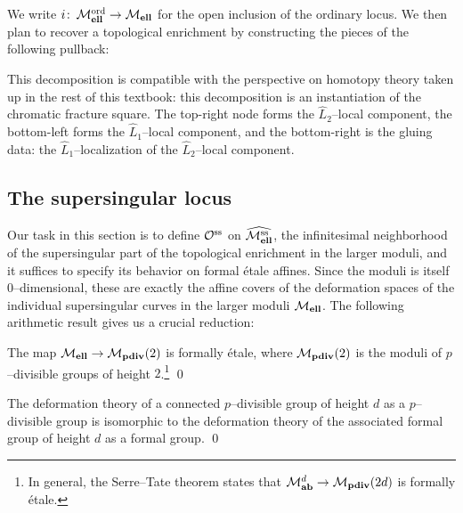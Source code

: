 \noindent We write $i\colon\thinspace \mathcal{M}_{\mathbf{ell}}^{\mathrm{ord}} \to \mathcal{M}_{\mathbf{ell}}$ for the open inclusion of the ordinary locus.  We then plan to recover a topological enrichment by constructing the pieces of the following pullback:
\begin{center}
\end{center}
This decomposition is compatible with the perspective on homotopy theory taken up in the rest of this textbook: this decomposition is an instantiation of the chromatic fracture square.  The top-right node forms the $\widehat L_2$--local component, the bottom-left forms the $\widehat L_1$--local component, and the bottom-right is the gluing data: the $\widehat L_1$--localization of the $\widehat L_2$--local component.






\subsection*{The supersingular locus}

Our task in this section is to define $\mathcal{O}^{\mathrm{ss}}$ on $\widehat{\mathcal{M}_{\mathbf{ell}}^{\mathrm{ss}}}$, the infinitesimal neighborhood of the supersingular part of the topological enrichment in the larger moduli, and it suffices to specify its behavior on formal \'etale affines.  Since the moduli is itself $0$--dimensional, these are exactly the affine covers of the deformation spaces of the individual supersingular curves in the larger moduli $\mathcal{M}_{\mathbf{ell}}$.  The following arithmetic result gives us a crucial reduction:

\begin{theorem}
The map $\mathcal{M}_{\mathbf{ell}} \to \mathcal{M}_{\mathbf{pdiv}}(2)$ is formally \'etale, where $\mathcal{M}_{\mathbf{pdiv}}(2)$ is the moduli of $p$--divisible groups of height $2$.\footnote{In general, the Serre--Tate theorem states that $\mathcal{M}_{\mathbf{ab}}^{d} \to \mathcal{M}_{\mathbf{pdiv}}(2d)$ is formally \'etale.} \qed
\end{theorem}
\begin{lemma}
The deformation theory of a connected $p$--divisible group of height $d$ as a $p$--divisible group is isomorphic to the deformation theory of the associated formal group of height $d$ as a formal group. \qed
\end{lemma}

